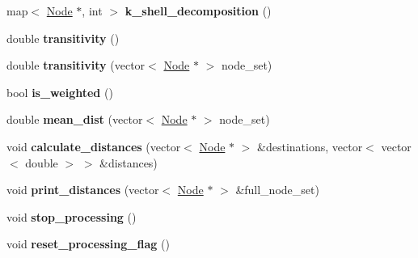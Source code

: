 \begin{DoxyCompactItemize}
\item 
\hypertarget{classNetwork_a436e1276adc9ba3fd7f7e6df05669694}{}map$<$ \hyperlink{classNode}{Node} $\ast$, int $>$ {\bfseries k\+\_\+shell\+\_\+decomposition} ()\label{classNetwork_a436e1276adc9ba3fd7f7e6df05669694}

\item 
\hypertarget{classNetwork_aea6f2b6662fb3894df7949ba44ff8b7c}{}double {\bfseries transitivity} ()\label{classNetwork_aea6f2b6662fb3894df7949ba44ff8b7c}

\item 
\hypertarget{classNetwork_a59d0553fe4819979e6bb432f2e4a2a99}{}double {\bfseries transitivity} (vector$<$ \hyperlink{classNode}{Node} $\ast$ $>$ node\+\_\+set)\label{classNetwork_a59d0553fe4819979e6bb432f2e4a2a99}

\item 
\hypertarget{classNetwork_a0668d8c063328bfe611f56c27509a8be}{}bool {\bfseries is\+\_\+weighted} ()\label{classNetwork_a0668d8c063328bfe611f56c27509a8be}

\item 
\hypertarget{classNetwork_a0a92d8f5afe94a16ed6446b6435959a5}{}double {\bfseries mean\+\_\+dist} (vector$<$ \hyperlink{classNode}{Node} $\ast$ $>$ node\+\_\+set)\label{classNetwork_a0a92d8f5afe94a16ed6446b6435959a5}

\item 
\hypertarget{classNetwork_a48d1feba1bd00925ef2b3b8710d7f237}{}void {\bfseries calculate\+\_\+distances} (vector$<$ \hyperlink{classNode}{Node} $\ast$ $>$ \&destinations, vector$<$ vector$<$ double $>$ $>$ \&distances)\label{classNetwork_a48d1feba1bd00925ef2b3b8710d7f237}

\item 
\hypertarget{classNetwork_a40116699c4df6117b9c24b877410520d}{}void {\bfseries print\+\_\+distances} (vector$<$ \hyperlink{classNode}{Node} $\ast$ $>$ \&full\+\_\+node\+\_\+set)\label{classNetwork_a40116699c4df6117b9c24b877410520d}

\item 
\hypertarget{classNetwork_a07a00fc58e7f7e0b63460c29084b8688}{}void {\bfseries stop\+\_\+processing} ()\label{classNetwork_a07a00fc58e7f7e0b63460c29084b8688}

\item 
\hypertarget{classNetwork_a4b96943d9095e3922741688add7ca818}{}void {\bfseries reset\+\_\+processing\+\_\+flag} ()\label{classNetwork_a4b96943d9095e3922741688add7ca818}

\end{DoxyCompactItemize}
